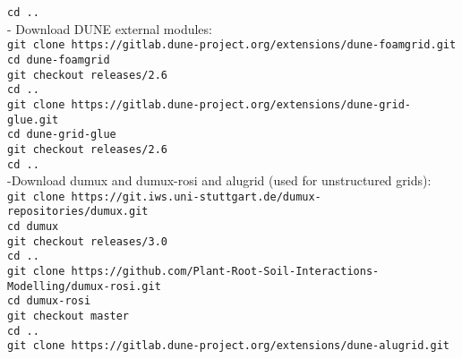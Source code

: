 		\hspace{\parindent} \texttt{cd ..}\\
- Download DUNE external modules:\\
\texttt{git clone https://gitlab.dune-project.org/extensions/dune-foamgrid.git}\\
    \hspace{\parindent} \texttt{cd dune-foamgrid}\\
    \hspace{\parindent} \texttt{git checkout releases/2.6}\\
		\hspace{\parindent} \texttt{cd ..}\\
\texttt{git clone https://gitlab.dune-project.org/extensions/dune-grid-glue.git}\\
    \hspace{\parindent} \texttt{cd dune-grid-glue}\\
    \hspace{\parindent} \texttt{git checkout releases/2.6}\\
		\hspace{\parindent} \texttt{cd ..}\\

-Download dumux and dumux-rosi and alugrid (used for unstructured grids):\\
\texttt{git clone https://git.iws.uni-stuttgart.de/dumux-repositories/dumux.git}\\
    \hspace{\parindent} \texttt{cd dumux}\\
    \hspace{\parindent} \texttt{git checkout releases/3.0}\\
		\hspace{\parindent} \texttt{cd ..}\\
\texttt{git clone https://github.com/Plant-Root-Soil-Interactions-Modelling/dumux-rosi.git}\\
    \hspace{\parindent} \texttt{cd dumux-rosi}\\
    \hspace{\parindent} \texttt{git checkout master}\\
		\hspace{\parindent} \texttt{cd ..}\\
\texttt{git clone https://gitlab.dune-project.org/extensions/dune-alugrid.git}\\

